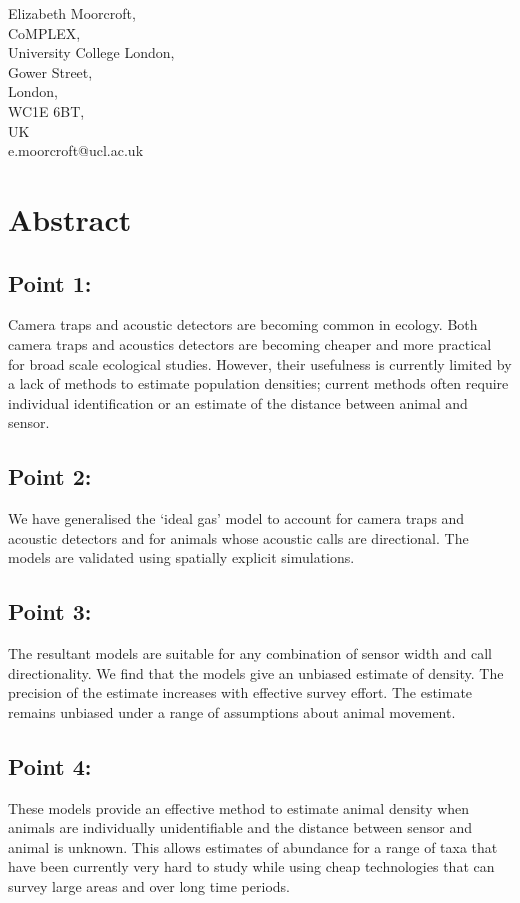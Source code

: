 \documentclass[a4paper,10pt,reqno,oneside]{amsart}
\begin{document}
Elizabeth Moorcroft,\\
CoMPLEX,\\
University College London,\\
Gower Street,\\
London,\\
WC1E 6BT, \\
UK\\
e.moorcroft@ucl.ac.uk\\


\clearpage



\section{Abstract}
\subsection*{Point 1:} Camera traps and acoustic detectors are becoming common in ecology. Both camera traps and acoustics detectors are becoming cheaper and more practical for broad scale ecological studies. However, their usefulness is currently limited by a lack of methods to estimate population densities; current methods often require individual identification or an estimate of the distance between animal and sensor.

\subsection*{Point 2:} We have generalised the `ideal gas' model to account for camera traps and acoustic detectors and for animals whose acoustic calls are directional. The models are validated using spatially explicit simulations. 

\subsection*{Point 3:} The resultant models are suitable for any combination of sensor width and call directionality. We find that the models give an unbiased estimate of density. The precision of the estimate increases with effective survey effort. The estimate remains unbiased under a range of assumptions about animal movement. 

\subsection*{Point 4:} These models provide an effective method to estimate animal density when animals are individually unidentifiable and the distance between sensor and animal is unknown. This allows estimates of abundance for a range of taxa that have been currently very hard to study while using cheap technologies that can survey large areas and over long time periods. 
\end{document}
